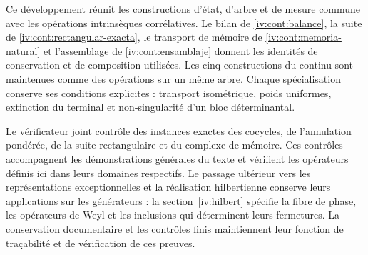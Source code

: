 Ce développement réunit les constructions d’état, d’arbre et de mesure
commune avec les opérations intrinsèques corrélatives. Le bilan de
\ref{iv:cont:balance}, la suite de \ref{iv:cont:rectangular-exacta},
le transport de mémoire de \ref{iv:cont:memoria-natural} et
l’assemblage de \ref{iv:cont:ensamblaje} donnent les identités de conservation
et de composition utilisées. Les cinq constructions du continu sont
maintenues comme des opérations sur un même arbre. Chaque spécialisation
conserve ses conditions explicites : transport isométrique, poids uniformes,
extinction du terminal et non-singularité d’un bloc déterminantal.

Le vérificateur joint contrôle des instances exactes des cocycles, de l’annulation pondérée, de la suite rectangulaire et du complexe de mémoire. Ces contrôles accompagnent les démonstrations générales du texte et vérifient les opérateurs définis ici dans leurs domaines respectifs. Le passage ultérieur vers les représentations exceptionnelles et la réalisation hilbertienne conserve leurs applications sur les générateurs : la section~\ref{iv:hilbert} spécifie la fibre de phase, les opérateurs de Weyl et les inclusions qui déterminent leurs fermetures. La conservation documentaire et les contrôles finis maintiennent leur fonction de traçabilité et de vérification de ces preuves.
